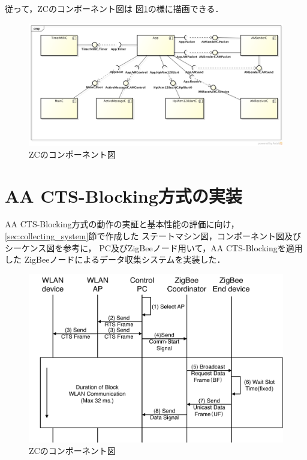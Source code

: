 \documentclass[12pt]{jreport}
\begin{document}
従って，ZCのコンポーネント図は
図\ref{fig:zc_component}の様に描画できる．

\begin{figure}[bt]
 \centering
 \includegraphics[width=\columnwidth]{figure/zc_component.pdf}
 \caption{ZCのコンポーネント図}
 \label{fig:zc_component}
\end{figure}


\section{AA CTS-Blocking方式の実装}
\label{sec:aa_cts_imple}

AA CTS-Blocking方式の動作の実証と基本性能の評価に向け，
\ref{sec:collecting_system}節で作成した
ステートマシン図，コンポーネント図及びシーケンス図を参考に，
PC及びZigBeeノード用いて，AA CTS-Blockingを適用した
ZigBeeノードによるデータ収集システムを実装した．

\begin{figure}[bt]
 \centering
 \includegraphics[width=\columnwidth]{figure/zigbeecomm_sequence.pdf}
 \caption{ZCのコンポーネント図}
 \label{fig:zigbeecomm_sequence}
\end{figure}
\end{document}
